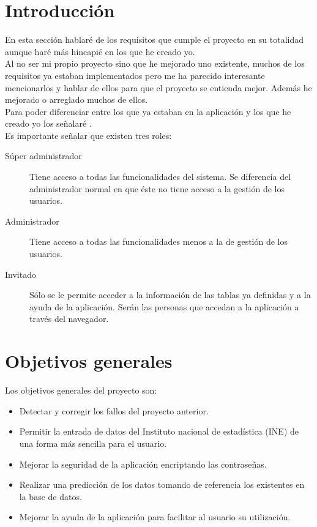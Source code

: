 
\section{Introducción}
En esta sección hablaré de los requisitos que cumple el proyecto en su totalidad aunque haré más hincapié en los que he creado yo.\\
Al no ser mi propio proyecto sino que he mejorado uno existente, muchos de los requisitos ya estaban implementados pero me ha parecido interesante mencionarlos y hablar de ellos para que el proyecto se entienda mejor. Además he mejorado o arreglado muchos de ellos.\\
Para poder diferenciar entre los que ya estaban en la aplicación y los que he creado yo los señalaré .\\
Es importante señalar que existen tres roles:
\begin{description}
    \item [Súper administrador] Tiene acceso a todas las funcionalidades del sistema. Se diferencia del administrador normal en que éste no tiene acceso a la gestión de los usuarios.
    \item [Administrador] Tiene acceso a todas las funcionalidades menos a la de gestión de los usuarios.
    \item [Invitado] Sólo se le permite acceder a la información de las tablas ya definidas y a la ayuda de la aplicación. Serán las personas que accedan a la aplicación a través del navegador.
\end{description}
\section{Objetivos generales}
Los objetivos generales del proyecto son:
\begin{itemize}
    \item Detectar y corregir los fallos del proyecto anterior.
    \item Permitir la entrada de datos del Instituto nacional de estadística (INE) de una forma más sencilla para el usuario.
    \item Mejorar la seguridad de la aplicación encriptando las contraseñas.
    \item Realizar una predicción de los datos tomando de referencia los existentes en la base de datos.
    \item Mejorar la ayuda de la aplicación para facilitar al usuario su utilización.
\end{itemize}
